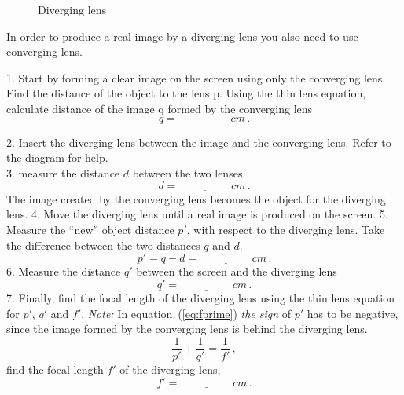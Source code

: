 \documentclass[11pt, a4paper]{article}
\begin{document}
\begin{figure}[tbh]
    \centering
    \def\svgwidth{0.7\textwidth}
    
    \caption{Diverging lens}
    \label{fig:divLens}
\end{figure}

In order to produce a real image by a diverging lens you also need to use converging lens.

1. Start by forming a clear image on the screen using only the converging lens. Find the distance of the object to the lens p.
Using the thin lens equation, calculate distance of the image q formed by the converging lens
\begin{equation*}
    q = \underline{\hspace{2cm}} \si{cm}\,.
\end{equation*}

2. Insert the diverging lens between the image and the converging lens. Refer to the diagram for help.\\
3. measure the distance $d$ between the two lenses.
\begin{equation*}
    d = \underline{\hspace{2cm}} \si{cm}\,.
\end{equation*}
The image created by the converging lens becomes the object for the diverging lens.
4. Move the diverging lens until a real image is produced on the screen.
5. Measure the ``new'' object distance $p'$, with respect to the diverging lens. Take the difference between the two distances $q$ and $d$.
\begin{equation*}
    p' = q - d  = \underline{\hspace{2cm}} \si{cm}\,.
\end{equation*}
6. Measure the distance $q'$ between the screen and the diverging lens
\begin{equation*}
     q'  = \underline{\hspace{2cm}} \si{cm}\,.
\end{equation*}
7. Finally, find the focal length of the diverging lens using the thin lens equation for $p'$, $q'$ and $f'$.
\textit{Note:} In equation~(\ref{eq:fprime}) \textit{the sign} of $p'$ has to be negative, since the image formed by
the converging lens is behind the diverging lens.
\begin{equation}
    \frac{1}{p'} + \frac{1}{q'} = \frac{1}{f'}\,,
\end{equation}
find the focal length $f'$ of the diverging lens,
\begin{equation*}
     f'  = \underline{\hspace{2cm}} \si{cm}\,.
     \label{eq:fprime}
\end{equation*}
\end{document}
